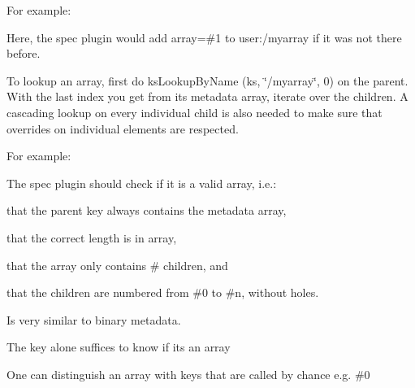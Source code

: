 For example\+:




Here, the {\ttfamily spec} plugin would add {\ttfamily array=\#1} to {\ttfamily user\+:/myarray} if it was not there before.

To lookup an array, first do {\ttfamily ks\+Lookup\+By\+Name (ks, \char`\"{}/myarray\char`\"{}, 0)} on the parent. With the last index you get from its metadata {\ttfamily array}, iterate over the children. A cascading lookup on every individual child is also needed to make sure that overrides on individual elements are respected.

For example\+:




The {\ttfamily spec} plugin should check if it is a valid array, i.\+e.\+:


\begin{DoxyItemize}
\item that the parent key always contains the metadata {\ttfamily array},
\item that the correct length is in {\ttfamily array},
\item that the array only contains {\ttfamily \#} children, and
\item that the children are numbered from {\ttfamily \#0} to {\ttfamily \#n}, without holes.
\end{DoxyItemize}


\begin{DoxyItemize}
\item Is very similar to {\ttfamily binary} metadata.
\item The key alone suffices to know if its an array
\item One can distinguish an array with keys that are called by chance e.\+g. {\ttfamily \#0}
\end{DoxyItemize}


